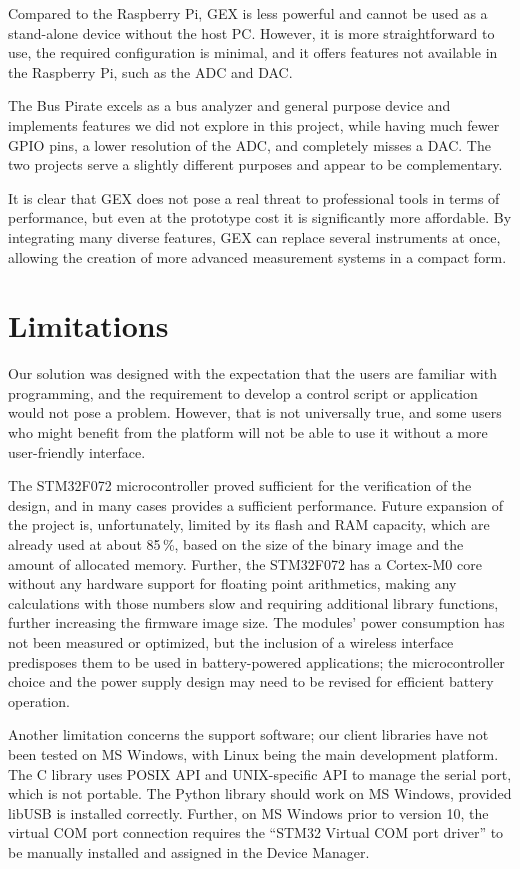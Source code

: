 Compared to the Raspberry Pi, GEX is less powerful and cannot be used as a stand-alone device without the host \gls{PC}. However, it is more straightforward to use, the required configuration is minimal, and it offers features not available in the Raspberry Pi, such as the \gls{ADC} and \gls{DAC}.

The Bus Pirate excels as a bus analyzer and general purpose device and implements features we did not explore in this project, while having much fewer \gls{GPIO} pins, a lower resolution of the \gls{ADC}, and completely misses a \gls{DAC}. The two projects serve a slightly different purposes and appear to be complementary.

It is clear that GEX does not pose a real threat to professional tools in terms of performance, but even at the prototype cost it is significantly more affordable. By integrating many diverse features, GEX can replace several instruments at once, allowing the creation of more advanced measurement systems in a compact form.

\section{Limitations}

Our solution was designed with the expectation that the users are familiar with programming, and the requirement to develop a control script or application would not pose a problem. However, that is not universally true, and some users who might benefit from the platform will not be able to use it without a more user-friendly interface.

The STM32F072 microcontroller proved sufficient for the verification of the design, and in many cases provides a sufficient performance. Future expansion of the project is, unfortunately, limited by its flash and \gls{RAM} capacity, which are already used at about 85\,\%, based on the size of the binary image and the amount of allocated memory. Further, the STM32F072 has a Cortex-M0 core without any hardware support for floating point arithmetics, making any calculations with those numbers slow and requiring additional library functions, further increasing the firmware image size. The modules' power consumption has not been measured or optimized, but the inclusion of a wireless interface predisposes them to be used in battery-powered applications; the microcontroller choice and the power supply design may need to be revised for efficient battery operation.

Another limitation concerns the support software; our client libraries have not been tested on MS Windows, with Linux being the main development platform. The C library uses POSIX \gls{API} and UNIX-specific \gls{API} to manage the serial port, which is not portable. The Python library should work on MS Windows, provided libUSB is installed correctly. Further, on MS Windows prior to version 10, the virtual COM port connection requires the ``STM32 Virtual COM port driver'' to be manually installed and assigned in the Device Manager. 

